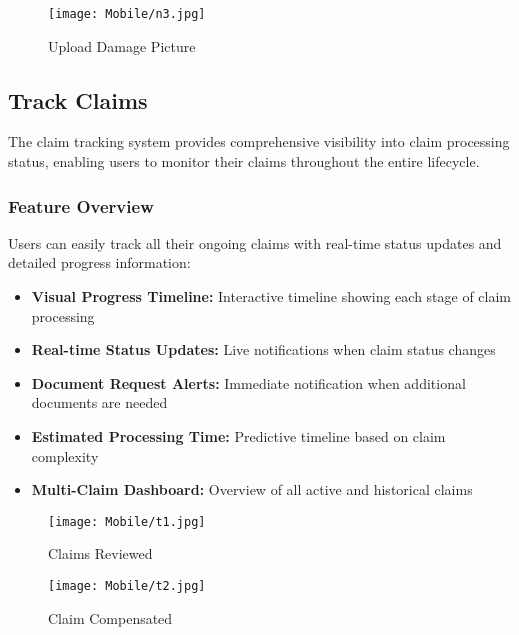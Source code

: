 \documentclass[12pt,a4paper]{report}
\begin{document}
\begin{figure}[H]
    \centering
    \begin{minipage}{0.45\textwidth}
        \centering
        \texttt{[image: Mobile/n3.jpg]}
        \caption{Upload Damage Picture}
        \label{fig:start_claim3}
    \end{minipage}
    \hfill
    
\end{figure}

\subsection{Track Claims}

The claim tracking system provides comprehensive visibility into claim processing status, enabling users to monitor their claims throughout the entire lifecycle.

\subsubsection{Feature Overview}

Users can easily track all their ongoing claims with real-time status updates and detailed progress information:

\begin{itemize}
    \item \textbf{Visual Progress Timeline:} Interactive timeline showing each stage of claim processing
    \item \textbf{Real-time Status Updates:} Live notifications when claim status changes
    \item \textbf{Document Request Alerts:} Immediate notification when additional documents are needed
   
    \item \textbf{Estimated Processing Time:} Predictive timeline based on claim complexity
    \item \textbf{Multi-Claim Dashboard:} Overview of all active and historical claims
\end{itemize}

\begin{figure}[H]
    \centering
    \begin{minipage}{0.45\textwidth}
        \centering
        \texttt{[image: Mobile/t1.jpg]}
        \caption{Claims Reviewed}
        \label{fig:track_claims1}
    \end{minipage}
    \hfill
    \begin{minipage}{0.45\textwidth}
        \centering
        \texttt{[image: Mobile/t2.jpg]}
        \caption{Claim Compensated}
        \label{fig:track_claims2}
    \end{minipage}
\end{figure}
\end{document}
